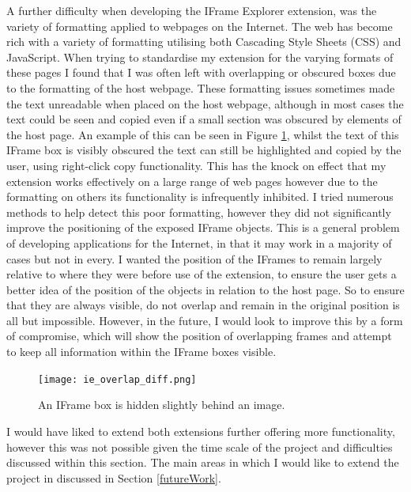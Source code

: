 \documentclass[12pt]{article}
\begin{document}
A further difficulty when developing the IFrame Explorer extension, was the variety of formatting applied to webpages on the Internet. The web has become rich with a variety of formatting utilising both Cascading Style Sheets (CSS) and JavaScript. When trying to standardise my extension for the varying formats of these pages I found that I was often left with overlapping or obscured boxes due to the formatting of the host webpage. These formatting issues sometimes made the text unreadable when placed on the host webpage, although in most cases the text could be seen and copied even if a small section was obscured by elements of the host page. An example of this can be seen in Figure \ref{fig:ie_overlap_diff}, whilst the text of this IFrame box is visibly obscured the text can still be highlighted and copied by the user, using right-click copy functionality. This has the knock on effect that my extension works effectively on a large range of web pages however due to the formatting on others its functionality is infrequently inhibited. I tried numerous methods to help detect this poor formatting, however they did not significantly improve the positioning of the exposed IFrame objects. This is a general problem of developing applications for the Internet, in that it may work in a majority of cases but not in every. I wanted the position of the IFrames to remain largely relative to where they were before use of the extension, to ensure the user gets a better idea of the position of the objects in relation to the host page. So to ensure that they are always visible, do not overlap and remain in the original position is all but impossible. However,  in the future, I would look to improve this by a form of compromise, which will show the position of overlapping frames and attempt to keep all information within the IFrame boxes visible. \\

\begin{figure}[H]
    \centering
    \texttt{[image: ie\_overlap\_diff.png]}
    \caption{An IFrame box is hidden slightly behind an image.}
    \label{fig:ie_overlap_diff}
\end{figure}

I would have liked to extend both extensions further offering more functionality, however this was not possible given the time scale of the project and difficulties discussed within this section. The main areas in which I would like to extend the project in discussed in Section \ref{futureWork}.
\end{document}
